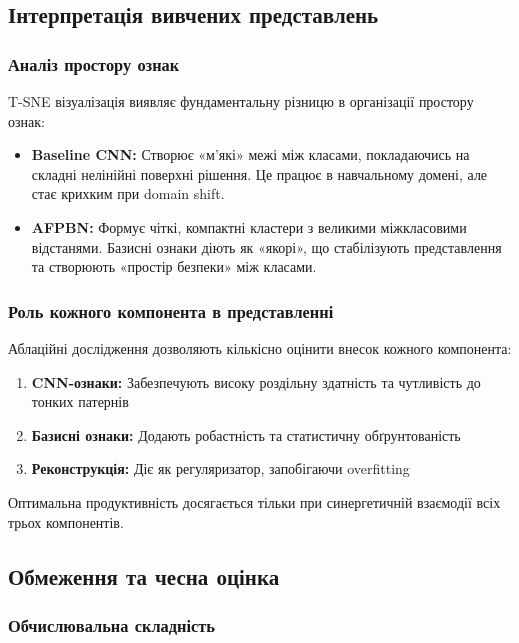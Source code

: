 \documentclass[12pt,a4paper]{article}
\begin{document}
\subsection{Інтерпретація вивчених представлень}

\subsubsection{Аналіз простору ознак}

T-SNE візуалізація виявляє фундаментальну різницю в організації простору ознак:

\begin{itemize}
	\item \textbf{Baseline CNN:} Створює «м'які» межі між класами, покладаючись на складні нелінійні поверхні рішення. Це працює в навчальному домені, але стає крихким при domain shift.
	
	\item \textbf{AFPBN:} Формує чіткі, компактні кластери з великими міжкласовими відстанями. Базисні ознаки діють як «якорі», що стабілізують представлення та створюють «простір безпеки» між класами.
\end{itemize}

\subsubsection{Роль кожного компонента в представленні}

Аблаційні дослідження дозволяють кількісно оцінити внесок кожного компонента:
\begin{enumerate}
	\item \textbf{CNN-ознаки:} Забезпечують високу роздільну здатність та чутливість до тонких патернів
	\item \textbf{Базисні ознаки:} Додають робастність та статистичну обґрунтованість
	\item \textbf{Реконструкція:} Діє як регуляризатор, запобігаючи overfitting
\end{enumerate}

Оптимальна продуктивність досягається тільки при синергетичній взаємодії всіх трьох компонентів.

\subsection{Обмеження та чесна оцінка}

\subsubsection{Обчислювальна складність}
\end{document}
